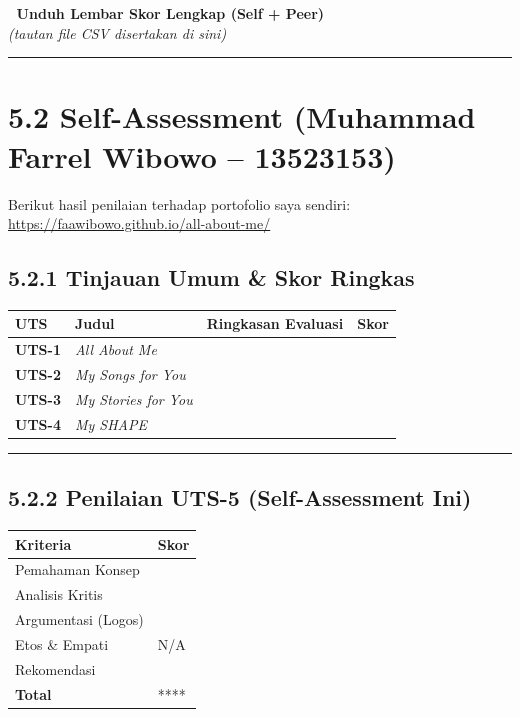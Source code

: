 \documentclass[
  letterpaper,
  DIV=11,
  numbers=noendperiod]{scrreprt}
\begin{document}
📎 \textbf{Unduh Lembar Skor Lengkap (Self + Peer)}\\
\emph{(tautan file CSV disertakan di sini)}

\begin{center}\rule{0.5\linewidth}{0.5pt}\end{center}

\section{5.2 Self-Assessment (Muhammad Farrel Wibowo --
13523153)}\label{self-assessment-muhammad-farrel-wibowo-13523153}

Berikut hasil penilaian terhadap portofolio saya sendiri:\\
\url{https://faawibowo.github.io/all-about-me/}

\subsection{5.2.1 Tinjauan Umum \& Skor
Ringkas}\label{tinjauan-umum-skor-ringkas}

\begin{longtable}[]{@{}llll@{}}
\toprule\noalign{}
UTS & Judul & Ringkasan Evaluasi & Skor \\
\midrule\noalign{}
\endhead
\bottomrule\noalign{}
\endlastfoot
\textbf{UTS-1} & \emph{All About Me} & & \\
\textbf{UTS-2} & \emph{My Songs for You} & & \\
\textbf{UTS-3} & \emph{My Stories for You} & & \\
\textbf{UTS-4} & \emph{My SHAPE} & & \\
\end{longtable}

\begin{center}\rule{0.5\linewidth}{0.5pt}\end{center}

\subsection{5.2.2 Penilaian UTS-5 (Self-Assessment
Ini)}\label{penilaian-uts-5-self-assessment-ini}

\begin{longtable}[]{@{}ll@{}}
\toprule\noalign{}
Kriteria & Skor \\
\midrule\noalign{}
\endhead
\bottomrule\noalign{}
\endlastfoot
Pemahaman Konsep & \\
Analisis Kritis & \\
Argumentasi (Logos) & \\
Etos \& Empati & N/A \\
Rekomendasi & \\
\textbf{Total} & **** \\
\end{longtable}
\end{document}
